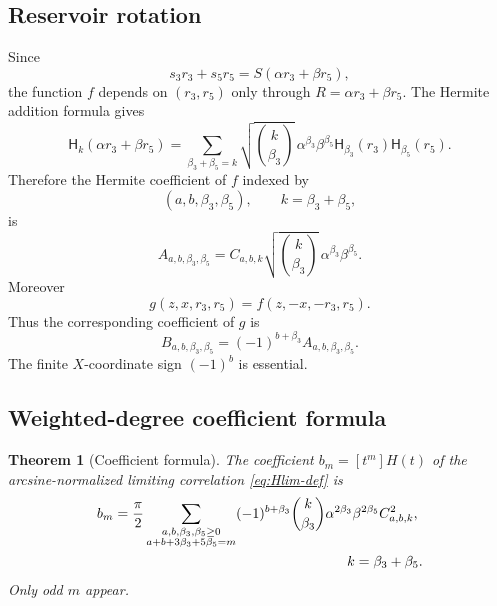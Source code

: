 \documentclass[11pt]{article}
\newtheorem{theorem}{Theorem}[section]
\newcommand{\1}{\mathbf{1}}
\newcommand{\Herm}{\mathsf H}
\begin{document}
\subsection{Reservoir rotation}

Since
\[
        s_3r_3+s_5r_5=S(\alpha r_3+\beta r_5),
\]
the function \(f\) depends on \((r_3,r_5)\) only through \(R=\alpha r_3+\beta r_5\).  The Hermite addition formula gives
\begin{equation}\label{eq:hermite-addition}
        \Herm_k(\alpha r_3+\beta r_5)
        =\sum_{\beta_3+\beta_5=k}
        \sqrt{\binom{k}{\beta_3}}\,
        \alpha^{\beta_3}\beta^{\beta_5}
        \Herm_{\beta_3}(r_3)\Herm_{\beta_5}(r_5).
\end{equation}
Therefore the Hermite coefficient of \(f\) indexed by
\[
        (a,b,\beta_3,\beta_5),\qquad k=\beta_3+\beta_5,
\]
is
\begin{equation}\label{eq:A-coeff}
        A_{a,b,\beta_3,\beta_5}
        =C_{a,b,k}\sqrt{\binom{k}{\beta_3}}\,
          \alpha^{\beta_3}\beta^{\beta_5}.
\end{equation}
Moreover
\begin{equation}\label{eq:g-transform}
        g(z,x,r_3,r_5)=f(z,-x,-r_3,r_5).
\end{equation}
Thus the corresponding coefficient of \(g\) is
\begin{equation}\label{eq:B-coeff}
        B_{a,b,\beta_3,\beta_5}
        =(-1)^{b+\beta_3}A_{a,b,\beta_3,\beta_5}.
\end{equation}
The finite \(X\)-coordinate sign \((-1)^b\) is essential.

\subsection{Weighted-degree coefficient formula}

\begin{theorem}[Coefficient formula]\label{thm:coeff-formula}
The coefficient \(b_m=[t^m]H(t)\) of the arcsine-normalized limiting correlation \eqref{eq:Hlim-def} is
\begin{align}\label{eq:b-m-formula}
        b_m={\pi\over2}
        \sum_{\substack{a,b,\beta_3,\beta_5\ge0\\
        a+b+3\beta_3+5\beta_5=m}}
        &(-1)^{b+\beta_3}
        \binom{k}{\beta_3}
        \alpha^{2\beta_3}\beta^{2\beta_5}
        C_{a,b,k}^2,        \\
        &\hspace{1.1in} k=\beta_3+\beta_5. \nonumber
\end{align}
Only odd \(m\) appear.
\end{theorem}
\end{document}
